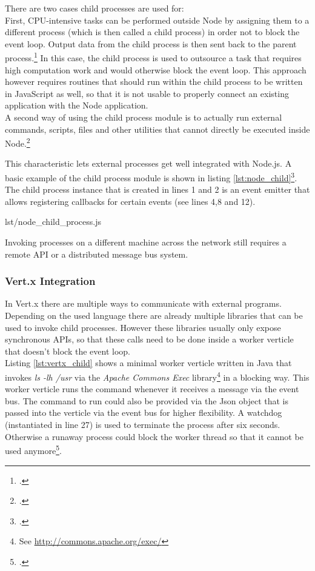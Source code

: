 There are two cases child processes are used for:\\
First, CPU-intensive tasks can be performed outside Node by assigning them to a
different process (which is then called a child process) in order not to block
the event loop. Output data from the child process is then sent back to the
parent process.\footcite[Cf.][63]{teixeira_2012} In this case, the child process is used to
outsource a task that requires high computation work and would otherwise block
the event loop. This approach however requires routines that should run
within the child process to be written in JavaScript as well, so that it is not
usable to properly connect an existing application with the Node application.\\
A second way of using the child process module is to actually run external
commands, scripts, files and other utilities that cannot directly be executed inside Node.\footcite[Cf.][63]{teixeira_2012}

This characteristic lets external processes get well integrated with Node.js.
A basic example of the child process module is shown in listing \ref{lst:node_child}\footcite[Taken from][]{node_child_process}.
The child process instance that is created in lines 1 and 2 is an event emitter that
allows registering callbacks for certain events (see lines 4,8 and 12).

%
{lst/node_child_process.js}


Invoking processes on a different machine across the network still
requires a remote API or a distributed message bus system.


\subsubsection{Vert.x Integration}
\label{vertx_integration}
In Vert.x there are multiple ways to communicate with external programs.
Depending on the used language there are already multiple libraries that can be
used to invoke child processes. However these libraries usually only expose
synchronous APIs, so that these calls need to be done inside a worker verticle
that doesn't block the event loop.\\
Listing \ref{lst:vertx_child} shows a minimal worker verticle written in Java
that invokes \textit{ls -lh /usr} via the \textit{Apache Commons Exec}
library\footnote{See \url{http://commons.apache.org/exec/}} in a blocking way.
This worker verticle runs the command whenever it receives a message via the event bus.
The command to run could also be provided via the Json object that is passed
into the verticle via the event bus for higher flexibility. A watchdog
(instantiated in line 27) is used to terminate the process after six seconds.
Otherwise a runaway process could block the worker thread so that it cannot be
used anymore\footcite[Cf.][67]{Evi_2007}.

